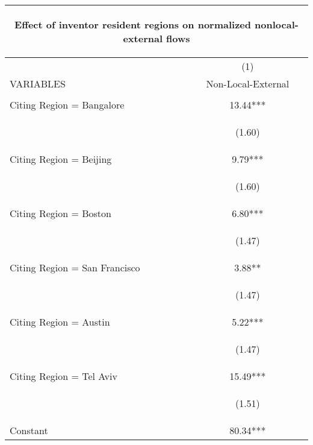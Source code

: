 \begin{center}
\begin{tabular}{lc}
\multicolumn{2}{c}{\begin{large}Effect of inventor resident regions on normalized nonlocal-external flows \label{snonlocalexternal}\end{large}} \\ \hline
 & (1) \\
VARIABLES & Non-Local-External \\ \hline
\vspace{4pt} & \begin{footnotesize}\end{footnotesize} \\
Citing Region = Bangalore & 13.44*** \\
\vspace{4pt} & \begin{footnotesize}(1.60)\end{footnotesize} \\
Citing Region = Beijing & 9.79*** \\
\vspace{4pt} & \begin{footnotesize}(1.60)\end{footnotesize} \\
Citing Region = Boston & 6.80*** \\
\vspace{4pt} & \begin{footnotesize}(1.47)\end{footnotesize} \\
Citing Region = San Francisco & 3.88** \\
\vspace{4pt} & \begin{footnotesize}(1.47)\end{footnotesize} \\
Citing Region = Austin & 5.22*** \\
\vspace{4pt} & \begin{footnotesize}(1.47)\end{footnotesize} \\
Citing Region = Tel Aviv & 15.49*** \\
\vspace{4pt} & \begin{footnotesize}(1.51)\end{footnotesize} \\
Constant & 80.34*** \\

\end{tabular}
\end{center}
